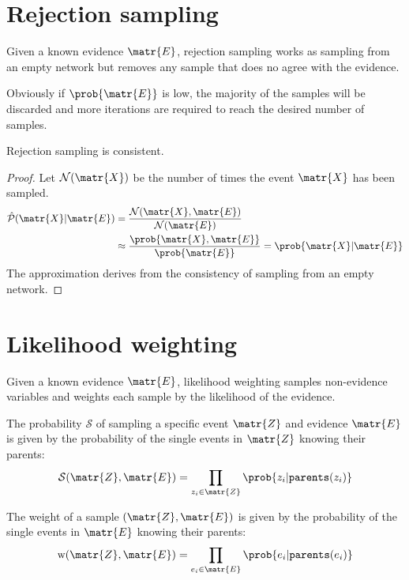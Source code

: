 \section{Rejection sampling}

Given a known evidence $\matr{E}$, rejection sampling works as sampling from an empty network
but removes any sample that does no agree with the evidence.

Obviously if $\prob{\matr{E}}$ is low, the majority of the samples will be discarded and 
more iterations are required to reach the desired number of samples.

\begin{theorem}
    Rejection sampling is consistent.

    \begin{proof}
        Let $\mathcal{N}(\matr{X})$ be the number of times the event $\matr{X}$ has been sampled.
        \[
            \begin{split}
                \hat{\mathcal{P}}(\matr{X} | \matr{E}) &= 
                \frac{\mathcal{N}(\matr{X}, \matr{E})}{\mathcal{N}(\matr{E})} \\
                &\approx \frac{\prob{\matr{X}, \matr{E}}}{\prob{\matr{E}}} =
                \prob{\matr{X} | \matr{E}}
            \end{split}    
        \]
        The approximation derives from the consistency of sampling from an empty network.
    \end{proof}
\end{theorem}



\section{Likelihood weighting}

Given a known evidence $\matr{E}$, likelihood weighting samples non-evidence variables and 
weights each sample by the likelihood of the evidence.

The probability $\mathcal{S}$ of sampling a specific event $\matr{Z}$ and evidence $\matr{E}$ is given by the
probability of the single events in $\matr{Z}$ knowing their parents:
\[ \mathcal{S}(\matr{Z}, \matr{E}) = \prod_{z_i \in \matr{Z}} \prob{z_i | \texttt{parents}(z_i)} \]

The weight of a sample $(\matr{Z}, \matr{E})$ is given by the
probability of the single events in $\matr{E}$ knowing their parents:
\[ \text{w}(\matr{Z}, \matr{E}) = \prod_{e_i \in \matr{E}} \prob{e_i | \texttt{parents}(e_i)} \]

